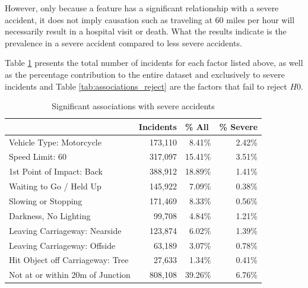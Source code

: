 However, only because a feature has a significant relationship with a severe accident, it does not imply causation such as traveling at 60 miles per hour will necessarily result in a hospital visit or death.
What the results indicate is the prevalence in a severe accident compared to less severe accidents.


Table \ref{tab:associations} presents the total number of incidents for each factor listed above, as well as the percentage contribution to the entire dataset and exclusively to severe incidents and Table \ref{tab:associations_reject} are the factors that fail to reject $H0$.

\begin{table}[ht]
    \centering
    \begin{tabular}{@{}lrrr@{}}
        \toprule
        & \multicolumn{1}{l}{Incidents} & \multicolumn{1}{l}{\% All} & \multicolumn{1}{l}{\% Severe} \\ \midrule
        Vehicle Type: Motorcycle & 173,110 & 8.41\% & 2.42\% \\
        Speed Limit: 60 & 317,097 & 15.41\% & 3.51\% \\
        1st Point of Impact: Back & 388,912 & 18.89\% & 1.41\% \\
        Waiting to Go / Held Up & 145,922 & 7.09\% & 0.38\% \\
        Slowing or Stopping & 171,469 & 8.33\% & 0.56\% \\
        Darkness, No Lighting & 99,708 & 4.84\% & 1.21\% \\
        Leaving Carriageway: Nearside & 123,874 & 6.02\% & 1.39\% \\
        Leaving Carriageway: Offside & 63,189 & 3.07\% & 0.78\% \\
        Hit Object off Carriageway: Tree & 27,633 & 1.34\% & 0.41\% \\
        Not at or within 20m of Junction & 808,108 & 39.26\% & 6.76\% \\ \bottomrule
    \end{tabular}
    \vspace{5}
    \caption{Significant associations with severe accidents}
    \label{tab:associations}
\end{table}

